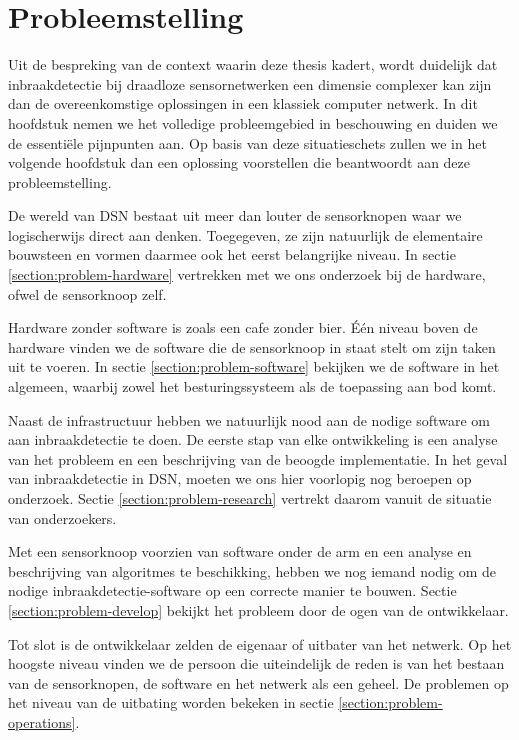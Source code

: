 
\chapter{Probleemstelling}
\label{chapter:probleemstelling}

Uit de bespreking van de context waarin deze thesis kadert, wordt duidelijk dat
inbraakdetectie bij draadloze sensornetwerken een dimensie complexer kan zijn
dan de overeenkomstige oplossingen in een klassiek computer netwerk. In dit
hoofdstuk nemen we het volledige probleemgebied in beschouwing en duiden we de
essenti\"ele pijnpunten aan. Op basis van deze situatieschets zullen we in het
volgende hoofdstuk dan een oplossing voorstellen die beantwoordt aan deze
probleemstelling.

De wereld van DSN bestaat uit meer dan louter de sensorknopen waar we
logischerwijs direct aan denken. Toegegeven, ze zijn natuurlijk de elementaire
bouwsteen en vormen daarmee ook het eerst belangrijke niveau. In sectie
\ref{section:problem-hardware} vertrekken met we ons onderzoek bij de hardware,
ofwel de sensorknoop zelf.

Hardware zonder software is zoals een cafe zonder bier. \'E\'en niveau boven de
hardware vinden we de software die de sensorknoop in staat stelt om zijn taken
uit te voeren. In sectie \ref{section:problem-software} bekijken we de software
in het algemeen, waarbij zowel het besturingssysteem als de toepassing aan bod
komt.

Naast de infrastructuur hebben we natuurlijk nood aan de nodige software om aan
inbraakdetectie te doen. De eerste stap van elke ontwikkeling is een analyse
van het probleem en een beschrijving van de beoogde implementatie. In het geval
van inbraakdetectie in DSN, moeten we ons hier voorlopig nog beroepen op
onderzoek. Sectie \ref{section:problem-research} vertrekt daarom vanuit de
situatie van onderzoekers.

Met een sensorknoop voorzien van software onder de arm en een analyse en
beschrijving van algoritmes te beschikking, hebben we nog iemand nodig om de
nodige inbraakdetectie-software op een correcte manier te bouwen. Sectie
\ref{section:problem-develop} bekijkt het probleem door de ogen van de
ontwikkelaar.

Tot slot is de ontwikkelaar zelden de eigenaar of uitbater van het netwerk. Op
het hoogste niveau vinden we de persoon die uiteindelijk de reden is van het
bestaan van de sensorknopen, de software en het netwerk als een geheel. De
problemen op het niveau van de uitbating worden bekeken in sectie
\ref{section:problem-operations}.


